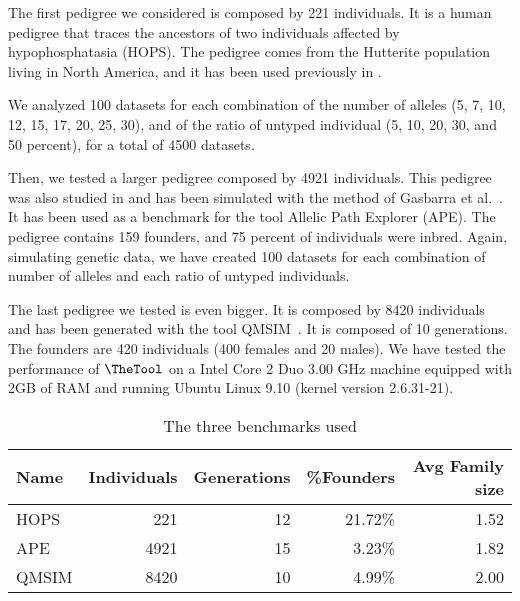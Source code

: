 The first pedigree we considered is composed by 221 individuals. It is a human
pedigree that traces the ancestors of two individuals affected by
hypophosphatasia (HOPS). The pedigree comes from the Hutterite population living
in North America, and it has been used previously in \cite{luolin,Pirinen2006}.

We analyzed 100 datasets for each combination of the number of alleles (5, 7, 10,
12, 15, 17, 20, 25, 30), and of the ratio of untyped individual (5, 10, 20, 30, and 50
percent), for a total of 4500 datasets. 


Then, we tested a larger pedigree composed by 4921 individuals. This pedigree
was also studied in \cite{Pirinen2006} and has been simulated with the method of
Gasbarra et al.~\cite{Gasbarra200575}. It has been used as a benchmark for the
tool Allelic Path Explorer (APE). The pedigree contains 159 founders, and
75 percent of individuals were inbred. Again, simulating genetic data, we have
created 100 datasets for each combination of number of alleles and each
ratio of untyped individuals.

The last pedigree we tested is even bigger. It is composed by 8420 individuals
and has been generated with the tool QMSIM~\cite{qmsim}. It is composed of 10
generations. The founders are 420 individuals (400 females and 20 males).  We
have tested the performance of ${\TheTool}$ on a Intel Core 2 Duo 3.00 GHz
machine equipped with 2GB of RAM and running Ubuntu Linux 9.10 (kernel version
2.6.31-21).


\begin{table}
  \centering
  \begin{tabular}{lrrrr}
    \textbf{Name}&\textbf{Individuals}&\textbf{Generations}&\textbf{\%Founders}&\textbf{Avg
    Family size}\\\hline
    HOPS  & 221  & 12 & 21.72\% & 1.52 \\
    APE   & 4921 & 15 & 3.23\%  & 1.82 \\ 
    QMSIM & 8420 & 10 & 4.99\%  & 2.00 \\\hline
  \end{tabular}
  \caption{The three benchmarks used }
  \label{tab:benchmarkdata}
\end{table}


